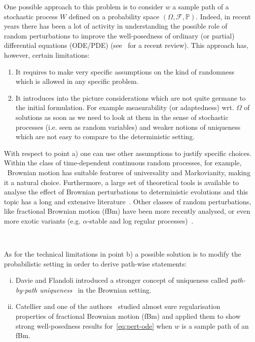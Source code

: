 \documentclass[10pt]{article}
\newcommand{\tmtextit}[1]{{\itshape{#1}}}
\newenvironment{enumeratealpha}{\begin{enumerate}[a{\textup{)}}] }{\end{enumerate}}
\newenvironment{enumerateroman}{\begin{enumerate}[i.] }{\end{enumerate}}
\begin{document}
One possible approach to this problem is to consider $w$ a sample path of a
stochastic process $W$ defined on a probability space $(\Omega, \mathcal{F},
\mathbb{P})$. Indeed, in recent years there has been a lot of activity in
understanding the possible role of random perturbations to improve the
well-posedness of ordinary (or partial) differential equations (ODE/PDE)
(see~{\cite{flandoli}} for a recent review). This approach has, however,
certain limitations:
\begin{enumeratealpha}
  \item It requires to make very specific assumptions on the kind of
  randomness which is allowed in any specific problem.
  
  \item It introduces into the picture considerations which are not quite
  germane to the initial formulation. For example measurability (or
  adaptedness) wrt. $\Omega$ of solutions as soon as we need to look at them
  in the sense of stochastic processes (i.e. seen as random variables) and
  weaker notions of uniqueness which are not easy to compare to the
  deterministic setting.
\end{enumeratealpha}
With respect to point a) one can use other assumptions to justify specific
choices. Within the class of time-dependent continuous random processes, for
example, \ Brownian motion has suitable features of universality and
Markovianity, making it a natural choice. Furthermore, a large set of
theoretical tools is available to analyse the effect of Brownian perturbations
to deterministic evolutions and this topic has a long and extensive
literature~{\cite{BFGM,dapratoflandoli,DFRV,FGP,krylov,veretennikov,zvonkin}}.
Other classes of random perturbations, like fractional Brownian motion (fBm)
have been more recently analysed, or even more exotic variants (e.g.
$\alpha$-stable and log regular
processes)~{\cite{banosproske,le,nualartouknine,priola2012,priola2020}}.

\

As for the technical limitations in point b) a possible solution is to modify
the probabilistic setting in order to derive path-wise statements:
\begin{enumerateroman}
  \item Davie and Flandoli introduced a stronger concept of uniqueness called
  \tmtextit{path-by-path uniqueness}~{\cite{davie,flandoli,flandoli2011}} in
  the Brownian setting.
  
  \item Catellier and one of the authors~{\cite{catelliergubinelli}} studied
  almost sure regularisation properties of fractional Brownian motion (fBm)
  and applied them to show strong well-posedness results
  for~{\eqref{eq:pert-ode}} when $w$ is a sample path of an fBm.
\end{enumerateroman}
\end{document}
